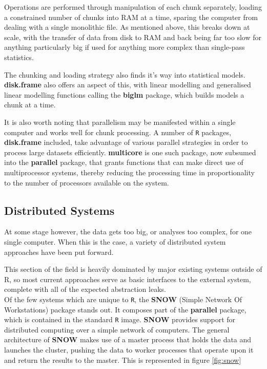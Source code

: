

Operations are performed through manipulation of each chunk separately, loading a constrained number of chunks into RAM at a time, sparing the computer from dealing with a single monolithic file\cite{zj19:_inges_data}.
As mentioned above, this breaks down at scale, with the transfer of data from disk to RAM and back being far too slow for anything particularly big if used for anything more complex than single-pass statistics.

The chunking and loading strategy also finds it's way into statistical models.
\textbf{disk.frame} also offers an aspect of this, with linear modelling and generalised linear modelling functions calling the \textbf{biglm} package, which builds models a chunk at a time\cite{lumley13}.

It is also worth noting that parallelism may be manifested within a single computer and works well for chunk processing.
A number of \texttt{R} packages, \textbf{disk.frame} included, take advantage of various parallel strategies in order to process large datasets efficiently.
\textbf{multicore} is one such package, now subsumed into the \textbf{parallel} package, that grants functions that can make direct use of multiprocessor systems, thereby reducing the processing time in proportionality to the number of processors available on the system\cite{team20:_r}.

\subsection{Distributed Systems}

At some stage however, the data gets too big, or analyses too complex, for one single computer.
When this is the case, a variety of distributed system approaches have been put forward.

This section of the field is heavily dominated by major existing systems outside of R, so most current approaches serve as basic interfaces to the external system, complete with all of the expected abstraction leaks\cite{spolsky2002abstraction}.\\

Of the few systems which are unique to \texttt{R}, the \textbf{SNOW} (Simple Network Of Workstations) package stands out.
It composes part of the \textbf{parallel} package, which is contained in the standard \texttt{R} image\cite{tierney18}.
\textbf{SNOW} provides support for distributed computing over a simple network of computers.
The general architecture of \textbf{SNOW} makes use of a master process that holds the data and launches the cluster, pushing the data to worker processes that operate upon it and return the results to the master.
This is represented in figure \ref{fig:snow}

